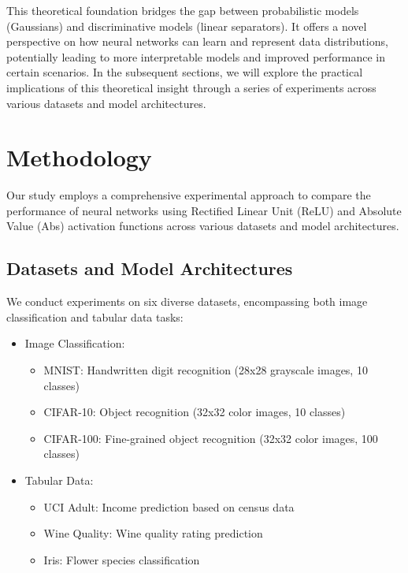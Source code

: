 \documentclass[11pt]{article}
\begin{document}
This theoretical foundation bridges the gap between probabilistic models (Gaussians) and discriminative models (linear separators). It offers a novel perspective on how neural networks can learn and represent data distributions, potentially leading to more interpretable models and improved performance in certain scenarios.
In the subsequent sections, we will explore the practical implications of this theoretical insight through a series of experiments across various datasets and model architectures.

\section{Methodology}

Our study employs a comprehensive experimental approach to compare the performance of neural networks using Rectified Linear Unit (ReLU) and Absolute Value (Abs) activation functions across various datasets and model architectures.

\subsection{Datasets and Model Architectures}
We conduct experiments on six diverse datasets, encompassing both image classification and tabular data tasks:

\begin{itemize}
\item Image Classification:

\begin{itemize}
\item MNIST: Handwritten digit recognition (28x28 grayscale images, 10 classes)
\item CIFAR-10: Object recognition (32x32 color images, 10 classes)
\item CIFAR-100: Fine-grained object recognition (32x32 color images, 100 classes)
\end{itemize}

\item Tabular Data:

\begin{itemize}
\item UCI Adult: Income prediction based on census data
\item Wine Quality: Wine quality rating prediction
\item Iris: Flower species classification
\end{itemize}

\end{itemize}
\end{document}

